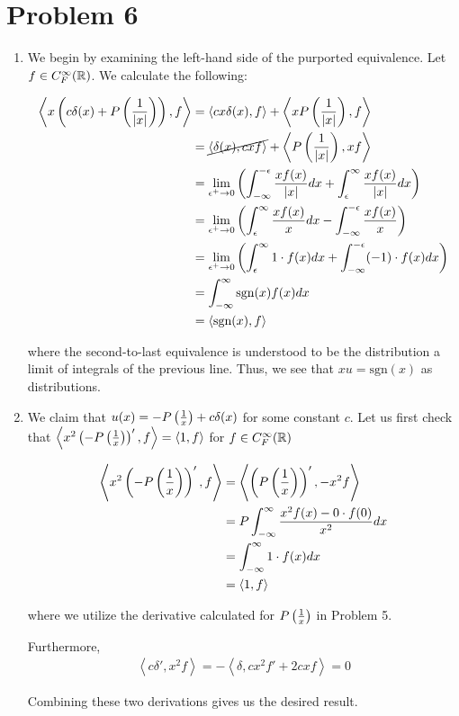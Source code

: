 \documentclass[12pt]{article}%
\newcommand{\disip}[2]{\left\langle #1, #2 \right\rangle}
\begin{document}
\section{Problem 6}
\begin{enumerate}
  \item We begin by examining the left-hand side of the purported equivalence. Let $f \in C_F^{\infty}({\mathbb{R}})$. We calculate the following:

  \begin{align*}
      \disip{x\left(c\delta(x) + \prinval{\frac{1}{\abs{x}}}\right)}{f} & = \disip{cx\delta(x)}{f} + \disip{ x\prinval{\frac{1}{\abs{x}}}}{f} \\
      & = \cancel{\disip{\delta(x)}{cxf}} + \disip{\prinval{\frac{1}{\abs{x}}}}{xf} \\
      & = \lim_{\epsilon^+ \rightarrow 0} \left(\int_{-\infty}^{-\epsilon} \frac{xf(x)}{\abs{x}} dx + \int_{\epsilon}^{\infty} \frac{xf(x)}{\abs{x}} dx \right) \\
      & =  \lim_{\epsilon^+ \rightarrow 0} \left(\int_{\epsilon}^{\infty} \frac{xf(x)}{x} dx  - \int_{-\infty}^{-\epsilon} \frac{xf(x)}{x} \right) \\
      & =  \lim_{\epsilon^+ \rightarrow 0} \left( \int_{\epsilon}^{\infty} 1 \cdot f(x) dx + \int_{-\infty}^{-\epsilon} (-1) \cdot f(x) dx \right) \\
      & = \int_{-\infty}^{\infty} \text{sgn}(x)f(x) dx \\
      & = \disip{\text{sgn}(x)}{f}
  \end{align*}

  where the second-to-last equivalence is understood to be the distribution a limit of integrals of the previous line. Thus, we see that $xu = \text{sgn}(x)$ as distributions.

  \item We claim that $u(x) = - P\left({\frac{1}{x}}\right) + c\delta(x)$ for some constant $c$. Let us first check that
  $\disip{x^2\left(-\prinval{\frac{1}{x}}\right)'}{f} = \disip{1}{f}$ for $f \in C_F^{\infty}({\mathbb{R}})$

  \begin{align*}
    \disip{x^2\left(-\prinval{\frac{1}{x}}\right)'}{f} & = \disip{\left(\prinval{\frac{1}{x}}\right)'}{-x^2f} \\
    & = P \int_{-\infty}^{\infty}{\frac{x^2f(x) - 0 \cdot f(0)}{x^2}} dx \\
    & = \int_{-\infty}^{\infty} 1 \cdot f(x) dx \\
    & = \disip{1}{f}
  \end{align*}

  where we utilize the derivative calculated for $P\left({\frac{1}{x}}\right)$ in Problem 5.

  Furthermore,
  \begin{align*}
      \disip{c\delta'}{x^2f} = - \disip{\delta}{cx^2f' + 2cxf} = 0
  \end{align*}

  Combining these two derivations gives us the desired result.


\end{enumerate}
\end{document}
